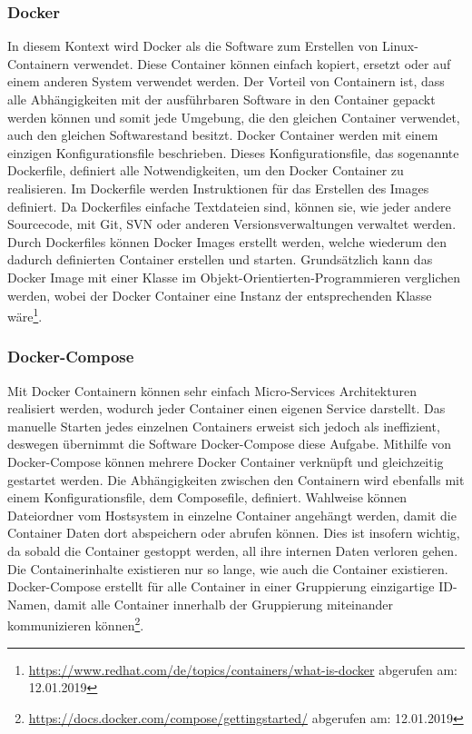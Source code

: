 \subsubsection{Docker}
In diesem Kontext wird Docker als die Software zum Erstellen von Linux-Containern verwendet.
Diese Container können einfach kopiert, ersetzt oder auf einem anderen System verwendet werden.
Der Vorteil von Containern ist, dass alle Abhängigkeiten mit der ausführbaren Software in den Container gepackt werden können und somit jede Umgebung, die den gleichen Container verwendet, auch den gleichen Softwarestand besitzt.
Docker Container werden mit einem einzigen Konfigurationsfile beschrieben.
Dieses Konfigurationsfile, das sogenannte Dockerfile, definiert alle Notwendigkeiten, um den Docker Container zu realisieren.
Im Dockerfile werden Instruktionen für das Erstellen des Images definiert.
Da Dockerfiles einfache Textdateien sind, können sie, wie jeder andere Sourcecode, mit Git, SVN oder anderen Versionsverwaltungen verwaltet werden.
Durch Dockerfiles können Docker Images erstellt werden, welche wiederum den dadurch definierten Container erstellen und starten.
Grundsätzlich kann das Docker Image mit einer Klasse im Objekt-Orientierten-Programmieren verglichen werden, wobei der Docker Container eine Instanz der entsprechenden Klasse wäre\footnote{\url{https://www.redhat.com/de/topics/containers/what-is-docker} abgerufen am: 12.01.2019}. 
\subsubsection{Docker-Compose}
Mit Docker Containern können sehr einfach Micro-Services Architekturen realisiert werden, wodurch jeder Container einen eigenen Service darstellt.
Das manuelle Starten jedes einzelnen Containers erweist sich jedoch als ineffizient, deswegen übernimmt die Software \glqq Docker-Compose\grqq{} diese Aufgabe.
Mithilfe von Docker-Compose können mehrere Docker Container verknüpft und gleichzeitig gestartet werden.
Die Abhängigkeiten zwischen den Containern wird ebenfalls mit einem Konfigurationsfile, dem Composefile, definiert.
Wahlweise können Dateiordner vom Hostsystem in einzelne Container angehängt werden, damit die Container Daten dort abspeichern oder abrufen können.
Dies ist insofern wichtig, da sobald die Container gestoppt werden, all ihre internen Daten verloren gehen.
Die Containerinhalte existieren nur so lange, wie auch die Container existieren.
Docker-Compose erstellt für alle Container in einer Gruppierung einzigartige ID-Namen, damit alle Container innerhalb der Gruppierung miteinander kommunizieren können\footnote{\url{https://docs.docker.com/compose/gettingstarted/} abgerufen am: 12.01.2019}.
